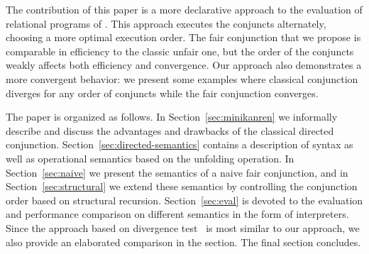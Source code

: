 The contribution of this paper is a more declarative approach to the evaluation of relational programs of \mk. This approach executes the conjuncts alternately, choosing a more optimal execution order.
The fair conjunction that we propose is comparable in efficiency to the classic unfair one, but the order of the conjuncts weakly affects both efficiency and convergence. Our approach also 
demonstrates a more convergent behavior: we present some examples where classical conjunction diverges for any order of conjuncts while the fair conjunction converges.

The paper is organized as follows. In Section~\ref{sec:minikanren} we informally describe \mk and discuss the advantages and drawbacks of the classical directed conjunction. Section~\ref{sec:directed-semantics} contains a
description of \mk syntax as well as operational semantics based on the unfolding operation. In Section~\ref{sec:naive} we present the semantics of a naive fair conjunction,
and in Section~\ref{sec:structural} we extend these semantics by controlling the conjunction order based on structural recursion. Section~\ref{sec:eval} is devoted to the evaluation
and performance comparison on different semantics in the form of interpreters. Since the approach based on divergence test~\cite{fair:DivTest} is most similar to our approach, we also provide an elaborated comparison in the section. The final section concludes.
